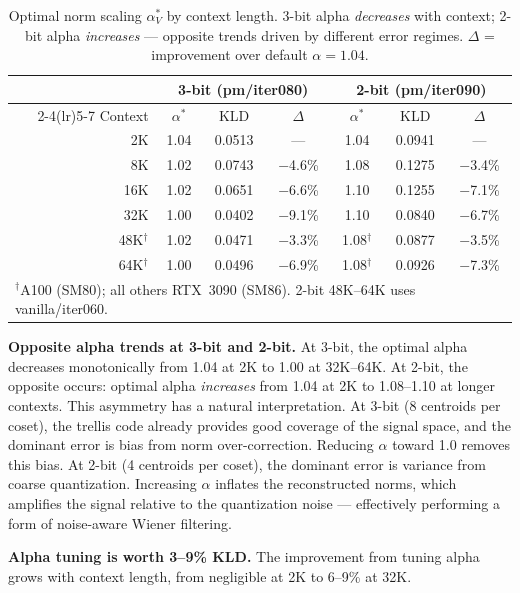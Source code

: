 \documentclass{article}
\begin{document}
\begin{table}[t]
\centering
\caption{Optimal norm scaling $\alpha_V^*$ by context length.
3-bit alpha \emph{decreases} with context; 2-bit alpha \emph{increases} ---
opposite trends driven by different error regimes. $\Delta$ = improvement over
default $\alpha = 1.04$.}
\label{tab:alpha}
\begin{tabular}{@{}rcccccc@{}}
\toprule
& \multicolumn{3}{c}{3-bit (pm/iter080)} & \multicolumn{3}{c}{2-bit (pm/iter090)} \\
\cmidrule(lr){2-4}\cmidrule(lr){5-7}
Context & $\alpha^*$ & KLD & $\Delta$ & $\alpha^*$ & KLD & $\Delta$ \\
\midrule
2K  & 1.04 & 0.0513 & ---     & 1.04 & 0.0941 & --- \\
8K  & 1.02 & 0.0743 & $-$4.6\% & 1.08 & 0.1275 & $-$3.4\% \\
16K & 1.02 & 0.0651 & $-$6.6\% & 1.10 & 0.1255 & $-$7.1\% \\
32K & 1.00 & 0.0402 & $-$9.1\% & 1.10 & 0.0840 & $-$6.7\% \\
\midrule
48K$^\dagger$ & 1.02 & 0.0471 & $-$3.3\% & 1.08$^\dagger$ & 0.0877 & $-$3.5\% \\
64K$^\dagger$ & 1.00 & 0.0496 & $-$6.9\% & 1.08$^\dagger$ & 0.0926 & $-$7.3\% \\
\bottomrule
\multicolumn{7}{l}{\footnotesize $^\dagger$A100 (SM80); all others RTX~3090 (SM86). 2-bit 48K--64K uses vanilla/iter060.}
\end{tabular}
\end{table}

\textbf{Opposite alpha trends at 3-bit and 2-bit.} At 3-bit, the optimal alpha
decreases monotonically from 1.04 at 2K to 1.00 at 32K--64K. At 2-bit, the
opposite occurs: optimal alpha \emph{increases} from 1.04 at 2K to 1.08--1.10
at longer contexts. This asymmetry has a natural interpretation. At 3-bit (8
centroids per coset), the trellis code already provides good coverage of the
signal space, and the dominant error is bias from norm over-correction. Reducing
$\alpha$ toward 1.0 removes this bias. At 2-bit (4 centroids per coset), the
dominant error is variance from coarse quantization. Increasing $\alpha$ inflates
the reconstructed norms, which amplifies the signal relative to the quantization
noise --- effectively performing a form of noise-aware Wiener filtering.

\textbf{Alpha tuning is worth 3--9\% KLD.} The improvement from tuning alpha
grows with context length, from negligible at 2K to 6--9\% at 32K.
\end{document}
